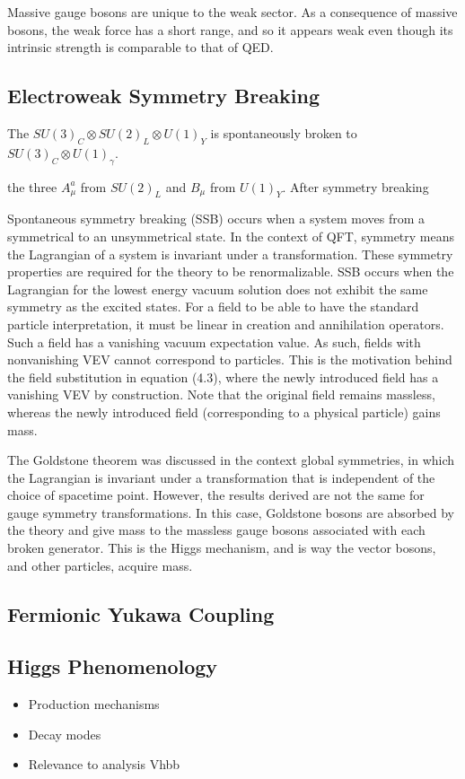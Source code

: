 Massive gauge bosons are unique to the weak sector. As a consequence of massive bosons, the weak force has a short range, and so it appears weak even though its intrinsic strength is comparable to that of QED.

\subsection{Electroweak Symmetry Breaking}\label{sec:ew_symmetry_breaking}

The $SU(3)_C \otimes SU(2)_L \otimes U(1)_Y$ is spontaneously broken to $SU(3)_C \otimes U(1)_\gamma$.

the three $A_\mu^a$ from $SU(2)_L$ and $B_\mu$ from $U(1)_Y$.
After symmetry breaking 

Spontaneous symmetry breaking (SSB) occurs when a system moves from a symmetrical to an unsymmetrical
state. In the context of QFT, symmetry means the Lagrangian of a system is invariant under a transformation.
These symmetry properties are required for the theory to be renormalizable. SSB occurs when the Lagrangian
for the lowest energy vacuum solution does not exhibit the same symmetry as the excited states. For a field to be
able to have the standard particle interpretation, it must be linear in creation and annihilation operators. Such
a field has a vanishing vacuum expectation value. As such, fields with nonvanishing VEV cannot correspond
to particles. This is the motivation behind the field substitution in equation (4.3), where the newly introduced
field has a vanishing VEV by construction. Note that the original field remains massless, whereas the newly
introduced field (corresponding to a physical particle) gains mass.

The Goldstone theorem was discussed in the context global symmetries, in which the Lagrangian is invariant
under a transformation that is independent of the choice of spacetime point. However, the results derived are
not the same for gauge symmetry transformations. In this case, Goldstone bosons are absorbed by the theory
and give mass to the massless gauge bosons associated with each broken generator. This is the Higgs mechanism,
and is way the vector bosons, and other particles, acquire mass.


\begin{comment}


\end{comment}



\subsection{Fermionic Yukawa Coupling}\label{sec:higgs_yukawa_coupling}

\subsection{Higgs Phenomenology}

\begin{itemize}
  \item Production mechanisms
  \item Decay modes
  \item Relevance to analysis Vhbb
\end{itemize}